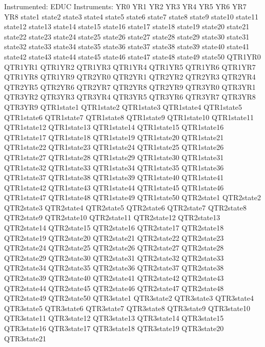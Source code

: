 Instrumented:  EDUC
Instruments:   YR0 YR1 YR2 YR3 YR4 YR5 YR6 YR7 YR8 state1 state2 state3
               state4 state5 state6 state7 state8 state9 state10 state11
               state12 state13 state14 state15 state16 state17 state18
               state19 state20 state21 state22 state23 state24 state25
               state26 state27 state28 state29 state30 state31 state32
               state33 state34 state35 state36 state37 state38 state39
               state40 state41 state42 state43 state44 state45 state46
               state47 state48 state49 state50 QTR1YR0 QTR1YR1 QTR1YR2
               QTR1YR3 QTR1YR4 QTR1YR5 QTR1YR6 QTR1YR7 QTR1YR8 QTR1YR9
               QTR2YR0 QTR2YR1 QTR2YR2 QTR2YR3 QTR2YR4 QTR2YR5 QTR2YR6
               QTR2YR7 QTR2YR8 QTR2YR9 QTR3YR0 QTR3YR1 QTR3YR2 QTR3YR3
               QTR3YR4 QTR3YR5 QTR3YR6 QTR3YR7 QTR3YR8 QTR3YR9 QTR1state1
               QTR1state2 QTR1state3 QTR1state4 QTR1state5 QTR1state6
               QTR1state7 QTR1state8 QTR1state9 QTR1state10 QTR1state11
               QTR1state12 QTR1state13 QTR1state14 QTR1state15 QTR1state16
               QTR1state17 QTR1state18 QTR1state19 QTR1state20 QTR1state21
               QTR1state22 QTR1state23 QTR1state24 QTR1state25 QTR1state26
               QTR1state27 QTR1state28 QTR1state29 QTR1state30 QTR1state31
               QTR1state32 QTR1state33 QTR1state34 QTR1state35 QTR1state36
               QTR1state37 QTR1state38 QTR1state39 QTR1state40 QTR1state41
               QTR1state42 QTR1state43 QTR1state44 QTR1state45 QTR1state46
               QTR1state47 QTR1state48 QTR1state49 QTR1state50 QTR2state1
               QTR2state2 QTR2state3 QTR2state4 QTR2state5 QTR2state6
               QTR2state7 QTR2state8 QTR2state9 QTR2state10 QTR2state11
               QTR2state12 QTR2state13 QTR2state14 QTR2state15 QTR2state16
               QTR2state17 QTR2state18 QTR2state19 QTR2state20 QTR2state21
               QTR2state22 QTR2state23 QTR2state24 QTR2state25 QTR2state26
               QTR2state27 QTR2state28 QTR2state29 QTR2state30 QTR2state31
               QTR2state32 QTR2state33 QTR2state34 QTR2state35 QTR2state36
               QTR2state37 QTR2state38 QTR2state39 QTR2state40 QTR2state41
               QTR2state42 QTR2state43 QTR2state44 QTR2state45 QTR2state46
               QTR2state47 QTR2state48 QTR2state49 QTR2state50 QTR3state1
               QTR3state2 QTR3state3 QTR3state4 QTR3state5 QTR3state6
               QTR3state7 QTR3state8 QTR3state9 QTR3state10 QTR3state11
               QTR3state12 QTR3state13 QTR3state14 QTR3state15 QTR3state16
               QTR3state17 QTR3state18 QTR3state19 QTR3state20 QTR3state21
